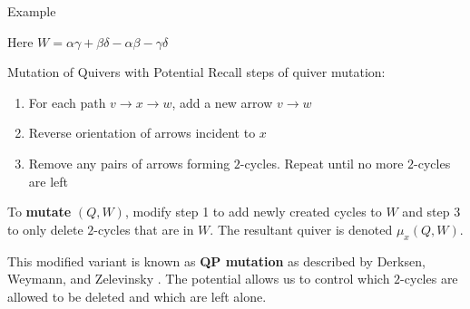 \begin{frame}{Example}
\begin{center}
	\end{center}
	Here $W = \alpha\gamma + \beta\delta - \alpha\beta - \gamma\delta$
\end{frame}

\begin{frame}{Mutation of Quivers with Potential}
Recall steps of quiver mutation:
\begin{enumerate}
    \item For each path $v \to x \to w$, add a new arrow $v \to w$
    \item Reverse orientation of arrows incident to $x$
    \item Remove any pairs of arrows forming $2$-cycles. Repeat until no more $2$-cycles are left
\end{enumerate}
To \textbf{mutate} $(Q, W)$, modify step 1 to add newly created cycles to $W$ and step 3 to only delete $2$-cycles that are in $W$. The resultant quiver is denoted $\mu_x(Q, W)$.

\vspace{0.5cm}

This modified variant is known as \textbf{QP mutation} as described by Derksen, Weymann, and Zelevinsky \cite{derksenQuiversPotentialsTheir2007}. The potential allows us to control which $2$-cycles are allowed to be deleted and which are left alone.
\end{frame}

